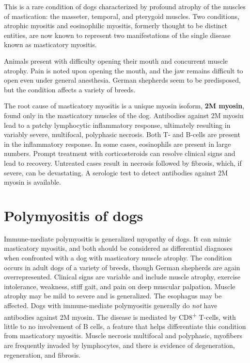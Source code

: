 \documentclass[openany]{book}
\begin{document}
This is a rare condition of dogs characterized by profound atrophy of
the muscles of mastication: the masseter, temporal, and pterygoid
muscles. Two conditions, atrophic myositis and eosinophilic myositis,
formerly thought to be distinct entities, are now known to represent two
manifestations of the single disease known as masticatory myositis.

Animals present with difficulty opening their mouth and concurrent
muscle atrophy. Pain is noted upon opening the mouth, and the jaw
remains difficult to open even under general anesthesia. German
shepherds seem to be predisposed, but the condition affects a variety of
breeds.

The root cause of masticatory myositis is a unique myosin isoform,
\textbf{2M myosin}, found only in the masticatory muscles of the dog.
Antibodies against 2M myosin lead to a patchy lymphocytic inflammatory
response, ultimately resulting in variably severe, multifocal,
polyphasic necrosis. Both T- and B-cells are present in the inflammatory
response. In some cases, eosinophils are present in large numbers.
Prompt treatment with corticosteroids can resolve clinical signs and
lead to recovery. Untreated cases result in necrosis followed by
fibrosis, which, if severe, can be devastating. A serologic test to
detect antibodies against 2M myosin is available.

\section{Polymyositis of dogs}\label{polymyositis-of-dogs}

Immune-mediate polymyositis is generalized myopathy of dogs. It can
mimic masticatory myositis, and both should be considered as
differential diagnoses when confronted with a dog with masticatory
muscle atrophy. The condition occurs in adult dogs of a variety of
breeds, though German shepherds are again overrepresented. Clinical
signs are variable and include muscle atrophy, exercise intolerance,
weakness, stiff gait, and pain on deep muscular palpation. Muscle
atrophy may be mild to severe and is generalized. The esophagus may be
affected. Dogs with immune-mediate polymyositis generally do \emph{not}
have antibodies against 2M myosin. The disease is mediated by
CD8\textsuperscript{+} T-cells, with little to no involvement of B
cells, a feature that helps differentiate this condition from
masticatory myositis. Muscle necrosis multifocal and polyphasic,
myofibers are frequently invaded by lymphocytes, and there is evidence
of degeneration, regeneration, and fibrosis.
\end{document}
